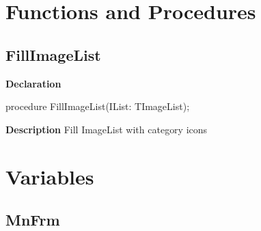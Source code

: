 \documentclass{report}
\newif\ifpdf
\begin{document}
\section{Functions and Procedures}
\ifpdf
\subsection*{\large{\textbf{FillImageList}}\normalsize\hspace{1ex}\hrulefill}
\else
\subsection*{FillImageList}
\fi
\label{manager-FillImageList}
\begin{list}{}{
\setlength{\itemindent}{0cm}
\setlength{\listparindent}{0cm}
\setlength{\leftmargin}{\evensidemargin}
\addtolength{\leftmargin}{\tmplength}
\settowidth{\labelsep}{X}
\addtolength{\leftmargin}{\labelsep}
\setlength{\labelwidth}{\tmplength}
}
\item[\textbf{Declaration}\hfill]
\ifpdf
\begin{flushleft}
\fi
\begin{ttfamily}
procedure FillImageList(IList: TImageList);\end{ttfamily}

\ifpdf
\end{flushleft}
\fi

\par
\item[\textbf{Description}]
Fill ImageList with category icons

\end{list}
\section{Variables}
\ifpdf
\subsection*{\large{\textbf{MnFrm}}\normalsize\hspace{1ex}\hrulefill}
\else
\end{document}
